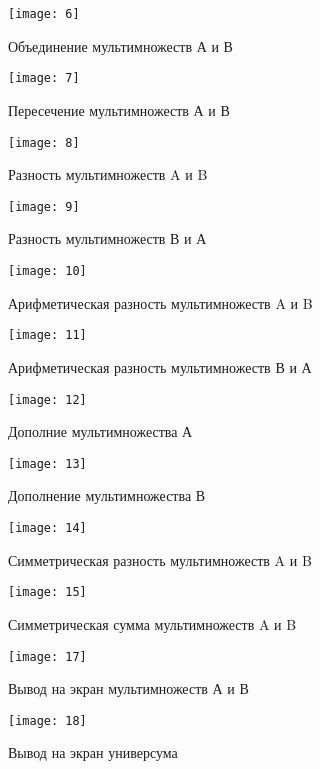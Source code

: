 \documentclass[10pt,a4paper,final]{article} %
\begin{document}
	\begin{figure}[h!]
		\centering\texttt{[image: 6]}
	\caption{Объединение мультимножеств А и В}
		\texttt{[image: 7]}
	\caption{Пересечение мультимножеств А и В}
\end{figure}
\clearpage
\begin{figure}[h!]
	\centering
	\texttt{[image: 8]}
	\caption{Разность мультимножеств A и B}
	\texttt{[image: 9]}
	\caption{Разность мультимножеств В и А}
		\texttt{[image: 10]}
	\caption{Арифметическая разность мультимножеств A и B}
\end{figure}
\clearpage
\begin{figure}[h!]
	\centering
	\texttt{[image: 11]}
	\caption{Арифметическая разность мультимножеств В и А}
	
	\texttt{[image: 12]}
	\caption{Дополние мультимножества А}
	
	\texttt{[image: 13]}
	\caption{Дополнение мультимножества В}
\end{figure}
\clearpage
\begin{figure}[h!]
	\centering
	\texttt{[image: 14]}
	\caption{Симметрическая разность мультимножеств A и B}
		\texttt{[image: 15]}
	\caption{Симметрическая сумма мультимножеств A и B}
		\texttt{[image: 17]}
	\caption{Вывод на экран мультимножеств А и В}
\end{figure}
\clearpage
\begin{figure}[h!]
	\centering
	\texttt{[image: 18]}
	\caption{Вывод на экран универсума}
\end{figure}



\newpage
\end{document}
